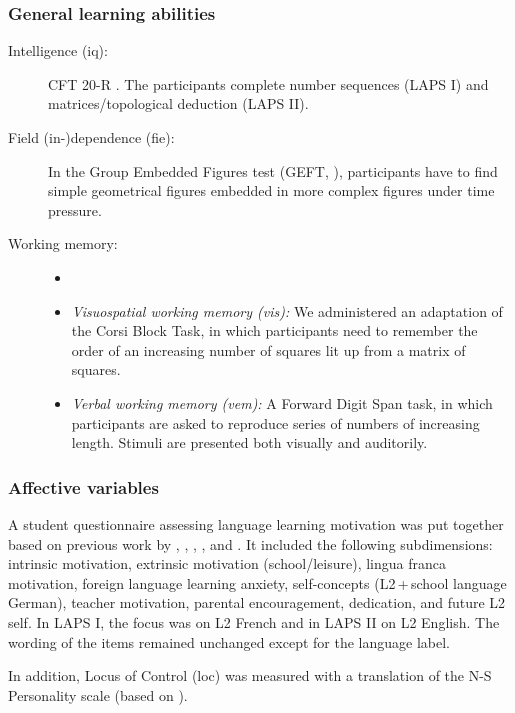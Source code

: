 \documentclass[output=paper]{langsci/langscibook}
\begin{document}
\subsubsection{General learning abilities}

\begin{description}
\item[Intelligence (iq):] CFT 20-R \citep{Weiss2006}. The participants complete number sequences (LAPS I) and matrices/topological deduction (LAPS II).

\item[Field (in-)dependence (fie):] In the Group Embedded Figures test (GEFT, \citealt{WitkinEtAl2014}), participants have to find simple geometrical figures embedded in more complex figures under time pressure.

\item[Working memory:]
\begin{itemize}
\item[]
\item \textit{Visuospatial working memory (vis):} We administered an adaptation of the Corsi Block Task, in which participants need to remember the order of an increasing number of squares lit up from a matrix of squares.
\item \textit{Verbal working memory (vem):} A Forward Digit Span task, in which participants are asked to reproduce series of numbers of increasing length. Stimuli are presented both visually and auditorily.
\end{itemize}
\end{description}

\subsubsection{Affective variables}

A student questionnaire assessing language learning motivation was put together based on previous work by \citet{HorwitzEtAl1986}, \citet{Stoeckli2004}, \citet{Doernyei2010}, \citet{Heinzmann2013}, and \citet{PeyerEtAl2016}. It included the following subdimensions: intrinsic motivation, extrinsic motivation (school/leisure), lingua franca motivation, foreign language learning anxiety, self-concepts (L2\,+\,school language German), teacher motivation, parental encouragement, dedication, and future L2 self. In LAPS I, the focus was on L2 French and in LAPS II on L2 English. The wording of the items remained unchanged except for the language label.

In addition, Locus of Control (loc) was measured with a translation of the N-S Personality scale (based on \citealt{NowickiStrickland1973}).
\end{document}
